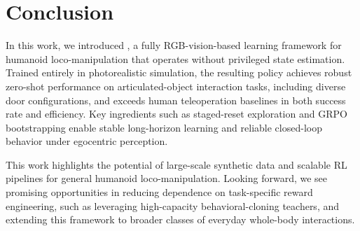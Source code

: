 \section{Conclusion}
\label{sec:conclusion}

In this work, we introduced \method{}, a fully RGB-vision-based learning framework for humanoid loco-manipulation that operates without privileged state estimation. Trained entirely in photorealistic simulation, the resulting policy achieves robust zero-shot performance on articulated-object interaction tasks, including diverse door configurations, and exceeds human teleoperation baselines in both success rate and efficiency. Key ingredients such as staged-reset exploration and GRPO bootstrapping enable stable long-horizon learning and reliable closed-loop behavior under egocentric perception.

This work highlights the potential of large-scale synthetic data and scalable RL pipelines for general humanoid loco-manipulation. Looking forward, we see promising opportunities in reducing dependence on task-specific reward engineering, such as leveraging high-capacity behavioral-cloning teachers, and extending this framework to broader classes of everyday whole-body interactions.

